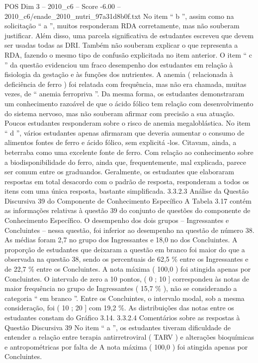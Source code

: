 \begin{textsample}{POS Dim 3 – 2010\_c6 – Score -6.00 – 2010\_c6/enade\_2010\_nutri\_97a31d8b0f.txt}
No item “ b ”, assim como na solicitação “ a ”, muitos responderam RDA corretamente, mas não souberam justificar.
Além disso, uma parcela significativa de estudantes escreveu que devem ser usadas todas as DRI.
Também não souberam explicar o que representa a RDA, fazendo o mesmo tipo de confusão explicitada no item anterior.
O item “ c ” da questão evidenciou um fraco desempenho dos estudantes em relação à fisiologia da gestação e às funções dos nutrientes.
A anemia ( relacionada à deficiência de ferro ) foi relatada com frequência, mas não era chamada, muitas vezes, de “ anemia ferropriva ”.
Da mesma forma, os estudantes demonstraram um conhecimento razoável de que o ácido fólico tem relação com desenvolvimento do sistema nervoso, mas não souberam afirmar com precisão a sua atuação.
Poucos estudantes responderam sobre o risco de anemia megaloblástica.
No item “ d ”, vários estudantes apenas afirmaram que deveria aumentar o consumo de alimentos fontes de ferro e ácido fólico, sem explicitá -los.
Citavam, ainda, a beterraba como uma excelente fonte de ferro.
Com relação ao conhecimento sobre a biodisponibilidade do ferro, ainda que, frequentemente, mal explicada, parece ser comum entre os graduandos.
Geralmente, os estudantes que elaboraram respostas em total desacordo com o padrão de resposta, responderam a todos os itens com uma única resposta, bastante simplificada. 3.3.2.3 Análise da Questão Discursiva 39 do Componente de Conhecimento Específico A Tabela 3.17 contém as informações relativas à questão 39 do conjunto de questões do componente de Conhecimento Específico.
O desempenho dos dois grupos – Ingressantes e Concluintes – nessa questão, foi inferior ao desempenho na questão de número 38.
As médias foram 2,7 no grupo dos Ingressantes e 18,0 no dos Concluintes.
A proporção de estudantes que deixaram a questão em branco foi maior do que a observada na questão 38, sendo os percentuais de 62,5 \% entre os Ingressantes e de 22,7 \% entre os Concluintes.
A nota máxima ( 100,0 ) foi atingida apenas por Concluintes.
O intervalo de zero a 10 pontos, ( 0 ; 10 ] correspondeu às notas de maior frequência no grupo de Ingressantes ( 15,7 \% ), não se considerando a categoria “ em branco ”.
Entre os Concluintes, o intervalo modal, sob a mesma consideração, foi ( 10 ; 20 ] com 19,2 \%.
As distribuições das notas entre os estudantes constam do Gráfico 3.14. 3.3.2.4 Comentários sobre as respostas à Questão Discursiva 39 No item “ a ”, os estudantes tiveram dificuldade de entender a relação entre terapia antirretroviral ( TARV ) e alterações bioquímicas e antropométricas por falta de A nota máxima ( 100,0 ) foi atingida apenas por Concluintes.

\end{textsample}
